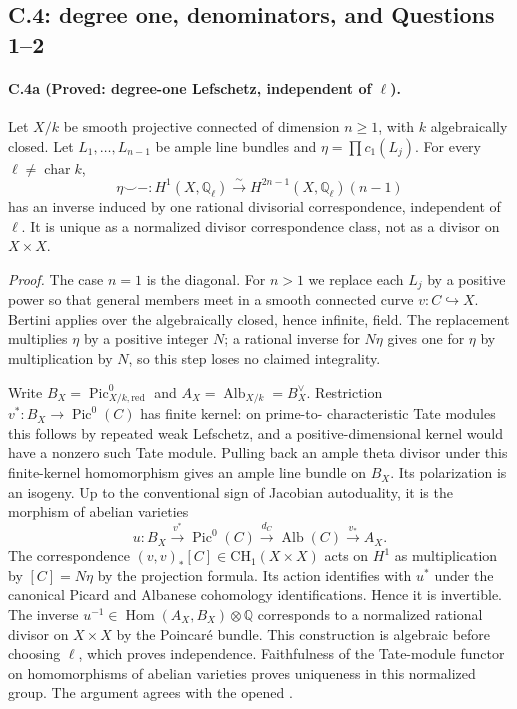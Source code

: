 \subsection{C.4: degree one, denominators, and Questions 1--2}

\paragraph{C.4a (Proved: degree-one Lefschetz, independent of $\ell$).}
Let $X/k$ be smooth projective connected of dimension $n\ge1$, with
$k$ algebraically closed. Let $L_1,\ldots,L_{n-1}$ be ample line bundles
and $\eta=\prod c_1(L_j)$. For every $\ell\ne\operatorname{char}k$,
\begin{equation}\label{eq:degree-one-lefschetz}
 \eta\smile-:H^1(X,\mathbb Q_\ell)\xrightarrow{\sim}
 H^{2n-1}(X,\mathbb Q_\ell)(n-1)
\end{equation}
has an inverse induced by one rational divisorial correspondence,
independent of $\ell$. It is unique as a normalized divisor
correspondence class, not as a divisor on $X\times X$.

\emph{Proof.}
The case $n=1$ is the diagonal. For $n>1$ we replace each $L_j$ by a
positive power so that general members meet in a smooth connected
curve $v:C\hookrightarrow X$. Bertini applies over the algebraically
closed, hence infinite, field. The replacement multiplies $\eta$ by
a positive integer $N$; a rational inverse for $N\eta$ gives one for
$\eta$ by multiplication by $N$, so this step loses no claimed
integrality.

Write $B_X=\operatorname{Pic}^0_{X/k,\mathrm{red}}$ and
$A_X=\operatorname{Alb}_{X/k}=B_X^\vee$. Restriction
$v^*:B_X\to\operatorname{Pic}^0(C)$ has finite kernel: on prime-to-
characteristic Tate modules this follows by repeated weak Lefschetz,
and a positive-dimensional kernel would have a nonzero such Tate
module. Pulling back an ample theta divisor under this finite-kernel
homomorphism gives an ample line bundle on $B_X$. Its polarization is
an isogeny. Up to the conventional sign of Jacobian autoduality, it is
the morphism of abelian varieties
\[
 u:B_X\xrightarrow{v^*}\operatorname{Pic}^0(C)
 \xrightarrow{d_C}\operatorname{Alb}(C)
 \xrightarrow{v_*}A_X.
\]
The correspondence $(v,v)_*[C]\in\mathrm{CH}_1(X\times X)$ acts on
$H^1$ as multiplication by $[C]=N\eta$ by the projection formula.
Its action identifies with $u^*$ under the canonical Picard and
Albanese cohomology identifications. Hence it is invertible. The inverse
$u^{-1}\in\operatorname{Hom}(A_X,B_X)\otimes\mathbb Q$ corresponds to
a normalized rational divisor on $X\times X$ by the Poincar\'e bundle.
This construction is algebraic before choosing $\ell$, which proves
independence. Faithfulness of the Tate-module functor on homomorphisms
of abelian varieties proves uniqueness in this normalized group.
The argument agrees with the opened
\citet[Appendix, Theorem 2A9(5)--(6)]{cyKleiman1968}.

